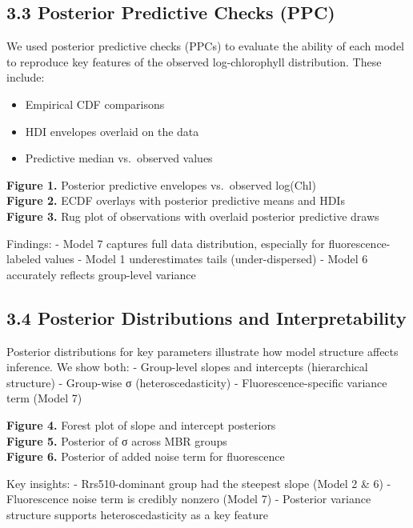 \documentclass[
]{agujournal2019}
\providecommand{\tightlist}{%
  \setlength{\itemsep}{0pt}\setlength{\parskip}{0pt}}\usepackage{longtable,booktabs,array}
\begin{document}
\subsection{3.3 Posterior Predictive Checks
(PPC)}\label{posterior-predictive-checks-ppc}

We used posterior predictive checks (PPCs) to evaluate the ability of
each model to reproduce key features of the observed log-chlorophyll
distribution. These include:

\begin{itemize}
\tightlist
\item
  Empirical CDF comparisons
\item
  HDI envelopes overlaid on the data
\item
  Predictive median vs.~observed values
\end{itemize}

\textbf{Figure 1.} Posterior predictive envelopes vs.~observed
log(Chl)\\
\textbf{Figure 2.} ECDF overlays with posterior predictive means and
HDIs\\
\textbf{Figure 3.} Rug plot of observations with overlaid posterior
predictive draws

Findings: - Model 7 captures full data distribution, especially for
fluorescence-labeled values - Model 1 underestimates tails
(under-dispersed) - Model 6 accurately reflects group-level variance

\subsection{3.4 Posterior Distributions and
Interpretability}\label{posterior-distributions-and-interpretability}

Posterior distributions for key parameters illustrate how model
structure affects inference. We show both: - Group-level slopes and
intercepts (hierarchical structure) - Group-wise σ (heteroscedasticity)
- Fluorescence-specific variance term (Model 7)

\textbf{Figure 4.} Forest plot of slope and intercept posteriors\\
\textbf{Figure 5.} Posterior of σ across MBR groups\\
\textbf{Figure 6.} Posterior of added noise term for fluorescence

Key insights: - Rrs510-dominant group had the steepest slope (Model 2 \&
6) - Fluorescence noise term is credibly nonzero (Model 7) - Posterior
variance structure supports heteroscedasticity as a key feature
\end{document}
